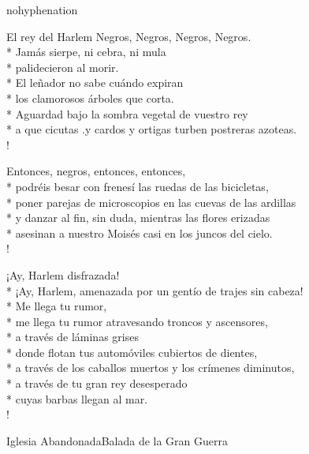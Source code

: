 \documentclass[
    a5paper,
    DIV=10,
    12pt,
    notitlepage,
    oneside,]
{scrbook} %
\begin{document}
\begin{hyphenrules}{nohyphenation}
\begin{poem}{El rey del Harlem}{}{\vspace{-1em}}
Negros, Negros, Negros, Negros.\\*
Jamás sierpe, ni cebra, ni mula\\*
palidecieron al morir.\\*
El leñador no sabe cuándo expiran\\*
los clamorosos árboles que corta.\\*
Aguardad bajo la sombra vegetal de vuestro rey\\*
a que cicutas .y cardos y ortigas turben postreras azoteas.\\!

Entonces, negros, entonces, entonces,\\*
podréis besar con frenesí las ruedas de las bicicletas,\\*
poner parejas de microscopios en las cuevas de las ardillas\\*
y danzar al fin, sin duda, mientras las flores erizadas\\*
asesinan a nuestro Moisés casi en los juncos del cielo.\\!

¡Ay, Harlem disfrazada!\\*
¡Ay, Harlem, amenazada por un gentío de trajes sin cabeza!\\*
Me llega tu rumor,\\*
me llega tu rumor atravesando troncos y ascensores,\\*
a través de láminas grises\\*
donde flotan tus automóviles cubiertos de dientes,\\*
a través de los caballos muertos y los crímenes diminutos,\\*
a través de tu gran rey desesperado\\*
cuyas barbas llegan al mar.\\!

\end{poem}

\begin{poem}{Iglesia Abandonada}{Balada de la Gran Guerra}{}


\end{poem}
\end{hyphenrules}
\end{document}
